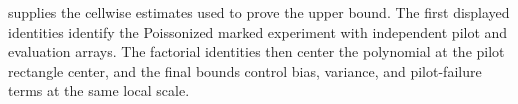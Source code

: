  supplies the cellwise estimates used to prove the upper bound. The first displayed identities identify the Poissonized marked experiment with independent pilot and evaluation arrays. The factorial identities then center the polynomial at the pilot rectangle center, and the final bounds control bias, variance, and pilot-failure terms at the same local scale.
